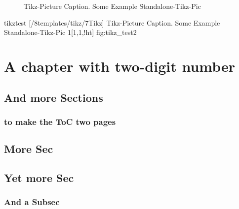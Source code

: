 \np
%
\begin{figure}[!htpb]
    \centering
    \caption{Tikz-Picture Caption. Some Example Standalone-Tikz-Pic}
    \label{fig:tikz_test}
\end{figure}
%
%
\tikzabb%
{tikztest}%
[\DenKrLayoutMainRootDir/8templates/tikz/7Tikz]%
{%
Tikz-Picture Caption. Some Example Standalone-Tikz-Pic
}%
{1}[1,1,!ht]%
{fig:tikz_test2}%
%
%



\setcounter{chapter}{9}
\chapter{A chapter with two-digit number}
\section{And more Sections}
\subsection{to make the ToC two pages}
\section{More Sec}
\section{Yet more Sec}
\subsection{And a Subsec}


